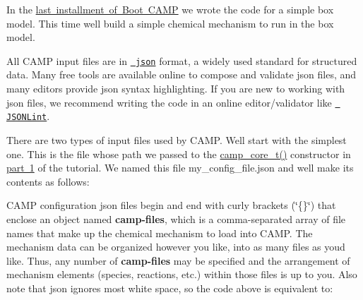 In the \mbox{\hyperlink{camp_tutorial_part_1}{last installment of Boot CAMP}} we wrote the code for a simple box model. This time we\textquotesingle{}ll build a simple chemical mechanism to run in the box model.

All CAMP input files are in \href{http://json.org}{\texttt{ json}} format, a widely used standard for structured data. Many free tools are available online to compose and validate {\ttfamily json} files, and many editors provide {\ttfamily json} syntax highlighting. If you are new to working with {\ttfamily json} files, we recommend writing the code in an online editor/validator like \href{https://jsonlint.com}{\texttt{ JSONLint}}.

There are two types of input files used by CAMP. We\textquotesingle{}ll start with the simplest one. This is the file whose path we passed to the \mbox{\hyperlink{structcamp__camp__core_1_1camp__core__t}{camp\+\_\+core\+\_\+t()}} constructor in \mbox{\hyperlink{camp_tutorial_part_1}{part 1}} of the tutorial. We named this file {\ttfamily my\+\_\+config\+\_\+file.\+json} and we\textquotesingle{}ll make its contents as follows\+: 
\begin{DoxyCode}{0}
\DoxyCodeLine{\{}
\DoxyCodeLine{  "{}camp-\/files"{} : [}
\DoxyCodeLine{  ]}
\DoxyCodeLine{\}}

\end{DoxyCode}
 CAMP configuration {\ttfamily json} files begin and end with curly brackets (\char`\"{}\{\}\char`\"{}) that enclose an object named {\bfseries{camp-\/files}}, which is a comma-\/separated array of file names that make up the chemical mechanism to load into CAMP. The mechanism data can be organized however you like, into as many files as you\textquotesingle{}d like. Thus, any number of {\bfseries{camp-\/files}} may be specified and the arrangement of mechanism elements (species, reactions, etc.) within those files is up to you. Also note that {\ttfamily json} ignores most white space, so the code above is equivalent to\+: 
\begin{DoxyCode}{0}

\end{DoxyCode}


